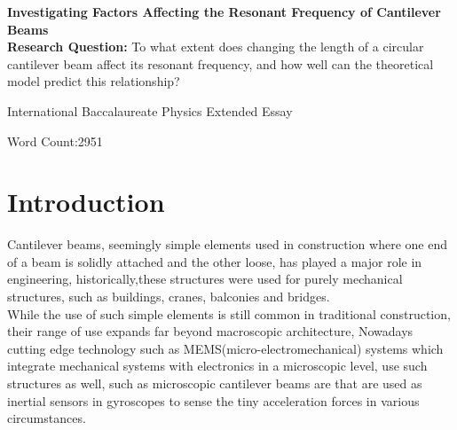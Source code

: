 \documentclass[a4paper,12pt]{article}
\newcommand{\ResearchQ}{To what extent does changing the length of a circular cantilever beam affect its resonant frequency, and how well can the theoretical model predict this relationship?}
\begin{document}
\begin{titlepage}
    \begin{center}
        \vspace*{1cm}

        \textbf{Investigating Factors Affecting the Resonant Frequency of Cantilever Beams}\\

        \vspace{.5cm}
        \textbf{Research Question:}
        \ResearchQ

        \vspace{0.5cm}
        International Baccalaureate Physics Extended Essay

        \vfill

        \vspace{0.8cm}

        Word Count:2951


    \end{center}
\end{titlepage}
\tableofcontents
{}
\pagebreak



\section{Introduction}\label{Intro}%

Cantilever beams, seemingly simple elements used in construction where one end of a beam is solidly attached and the other loose, has played a major role in engineering, historically,these structures were used for purely mechanical structures, such as buildings, cranes, balconies and bridges.\autocite{BuildingConstructionBook}\\
While the use of such simple elements is still common in traditional construction, their range of use expands far beyond macroscopic architecture, Nowadays cutting edge technology such as MEMS(micro-electromechanical) systems which integrate mechanical systems with electronics in a microscopic level, use such structures as well, such as microscopic cantilever beams are that are used as inertial sensors in gyroscopes to sense the tiny acceleration forces in various circumstances.\autocite{MemsBook}%
\end{document}
